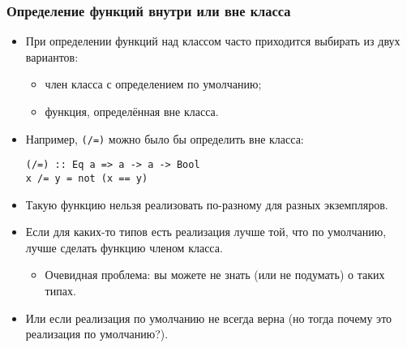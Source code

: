 \documentclass[10pt]{beamer}
\begin{document}
\begin{frame}[fragile]
\frametitle{Определение функций внутри или вне класса}
\begin{itemize}
    \item При определении функций над классом часто приходится выбирать из двух вариантов: 
    \begin{itemize}
        \item член класса с определением по умолчанию;
        \item функция, определённая вне класса.
    \end{itemize}
    \item Например, \lstinline|(/=)| можно было бы определить вне класса:
\begin{lstlisting}
(/=) :: Eq a => a -> a -> Bool
x /= y = not (x == y)
\end{lstlisting}\pause
    \item Такую функцию нельзя реализовать по-разному для разных экземпляров.\pause
    \item Если для каких-то типов есть реализация лучше той, что по умолчанию, лучше сделать функцию членом класса.
    \pause
    \begin{itemize}
        \item Очевидная проблема: вы можете не знать (или не подумать) о таких типах.
    \end{itemize}
    \pause
    \item Или если реализация по умолчанию не всегда верна \pause(но тогда почему это реализация по умолчанию?).
\end{itemize}
\end{frame}


\end{document}
